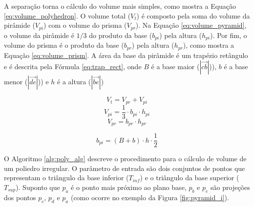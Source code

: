 A separação torna o cálculo do volume mais simples, como mostra a Equação \ref{eq:volume_polyhedron}. 
O volume total ($V_t$) é composto pela soma do volume da pirâmide ($V_{pi}$) com o volume do prisma ($V_{pr}$).
Na Equação \ref{eq:volume_pyramid}, o volume da pirâmide é $1/3$ do produto da base ($b_{pi}$) pela altura ($h_{pi}$). 
Por fim, o volume do prisma é o produto da base ($b_{pr}$) pela altura  ($h_{pr}$), como mostra a Equação \ref{eq:volume_prism}.
A área da base da pirâmide é um trapézio retângulo e é descrita pela Fórmula \ref{eq:trap_rect}, onde $B$ é a base maior ($\left | \overrightarrow{cb} \right |$)), $b$ é a base menor ($\left | \overrightarrow{de} \right |$)) e $h$ é a altura ($\left | \overrightarrow{be} \right |$)


\begin{multicols}{3}
    \begin{equation}
        \label{eq:volume_polyhedron}
        V_t = V_{pr} + V_{pi}
    \end{equation}
    \begin{equation}
        \label{eq:volume_prism}
        V_{pi} = \frac{1}{3} \cdot b_{pi} \cdot h_{pi}
    \end{equation}
    \begin{equation}
        \label{eq:volume_pyramid}
        V_{pr} = b_{pr} \cdot h_{pr}
    \end{equation}
\end{multicols}

\begin{equation}
    \label{eq:trap_rect}
    b_{pi} = (B+b) \cdot h \cdot \frac{1}{2}
\end{equation}

\iffalse
O Algoritmo \ref{alg:poly_alg} descreve o procedimento para o cálculo de volume de um poliedro irregular. 
O parâmetro de entrada são dois conjuntos de pontos que representam o triângulo da base inferior ($T_{inf}$) e o triângulo da base superior ($T_{sup}$).
Suponto que $p_a$ é o ponto mais próximo ao plano base, $p_b$ e $p_e$ são projeções dos pontos $p_c$, $p_d$ e $p_a$ (como ocorre no exemplo da Figura \ref{fig:pyramid_i}).


